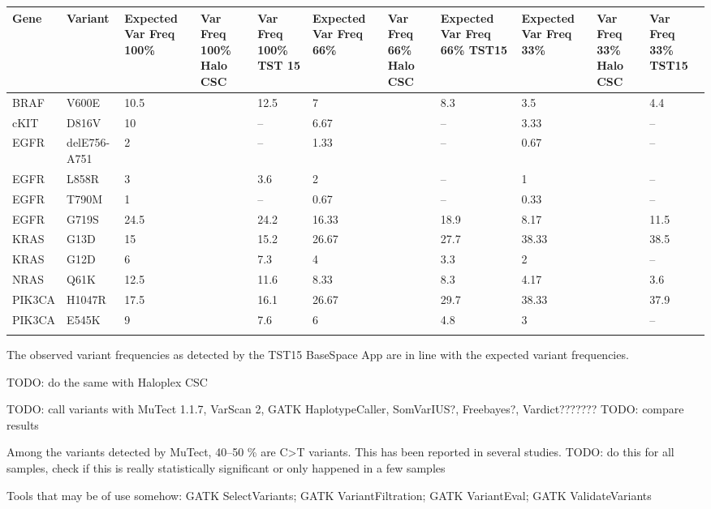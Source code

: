 \begin{table}
\begin{tabular}{p{3.5cm} p{1cm} p{1cm}}\\
\hline
Gene & Variant & Expected Var Freq 100\% &  Var Freq 100\% Halo CSC &  Var Freq 100\% TST 15 & Expected Var Freq 66\% &  Var Freq 66\% Halo CSC & Expected Var Freq 66\% TST15 & Expected Var Freq 33\% & Var Freq 33\% Halo CSC & Var Freq 33\% TST15 \\
\hline
BRAF & V600E & 10.5 & & 12.5 & 7 & & 8.3 & 3.5 & & 4.4 \\
cKIT & D816V & 10 & & -- & 6.67 & & -- & 3.33 & & -- \\
EGFR & delE756-A751 & 2 & & -- & 1.33 & & -- & 0.67 & & -- \\
EGFR & L858R & 3 & & 3.6 & 2 & & -- & 1 & & -- \\
EGFR & T790M & 1 & & -- & 0.67 & & -- & 0.33 & & -- \\
EGFR & G719S & 24.5 & & 24.2 & 16.33 & & 18.9 & 8.17 & & 11.5 \\
KRAS & G13D & 15 & & 15.2 & 26.67 & & 27.7 & 38.33 & & 38.5 \\
KRAS & G12D & 6 & & 7.3 & 4 & & 3.3 & 2 & & -- \\
NRAS & Q61K & 12.5 & & 11.6 & 8.33 & & 8.3 & 4.17 & & 3.6 \\
PIK3CA & H1047R & 17.5 & & 16.1 & 26.67 & & 29.7 & 38.33 & & 37.9 \\
PIK3CA & E545K & 9 & & 7.6 & 6 & & 4.8 & 3 & & -- \\
\label{horizon_analysis}
\end{tabular}
\end{table}

The observed variant frequencies as detected by the TST15 BaseSpace App are
in line with the expected variant frequencies.

TODO: do the same with Haloplex CSC

TODO: call variants with MuTect 1.1.7, VarScan 2, GATK HaplotypeCaller, SomVarIUS?, Freebayes?, Vardict???????
TODO: compare results

Among the variants detected by MuTect, 40--50 \% are C>T variants. This has been reported in several studies.
TODO: do this for all samples, check if this is really statistically significant or only happened in a few samples

Tools that may be of use somehow: GATK SelectVariants; GATK VariantFiltration; GATK VariantEval; GATK ValidateVariants
